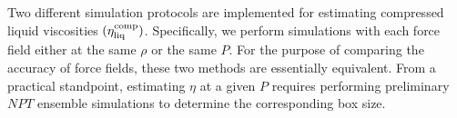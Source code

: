 \documentclass[preprint,review,12pt]{elsarticle}
\begin{document}
%	
	
	Two different simulation protocols are implemented for estimating compressed liquid viscosities $(\eta_{\rm liq}^{\rm comp})$. Specifically, we perform simulations with each force field either at the same $\rho$ or the same $P$. For the purpose of comparing the accuracy of force fields, these two methods are essentially equivalent. From a practical standpoint, estimating $\eta$ at a given $P$ requires performing preliminary $NPT$ ensemble simulations to determine the corresponding box size.
	
	
%	 
	
\end{document}
